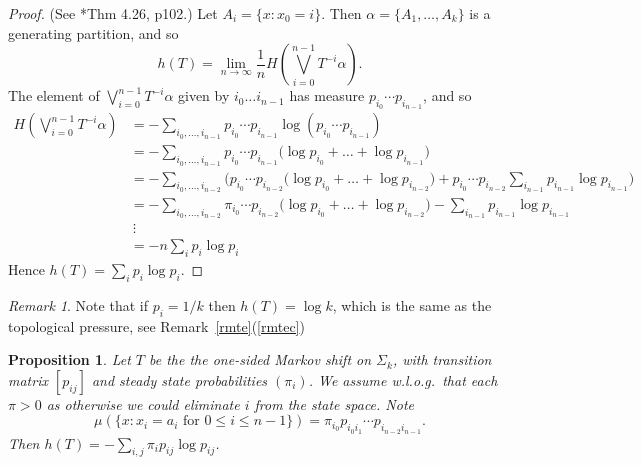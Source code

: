 \documentclass[a4paper]{amsart}
\theoremstyle{plain}
\newtheorem{proposition}[theorem]{Proposition}
\theoremstyle{definition}
\theoremstyle{remark}
\newtheorem{remark}[theorem]{Remark}
\begin{document}
\begin{proof} (See \cite{Wal}*{Thm 4.26, p102}.)
  Let $ A_i = \{ x: x_0 = i \} $.  Then $ \alpha = \{A_1, \dots, A_k\} $ is a generating partition, and so
\[
h(T) = \lim_{n\to \infty} \frac{1}{n} H\left(\bigvee_{i=0}^{n-1} T^{-i} \alpha \right).
\]
The element of $ \bigvee_{i=0}^{n-1} T^{-i} \alpha$ given by $ i_0\dots i_{n-1} $ has measure 
$ p_{i_0}\cdots p_{i_{n-1}} $, and so
\begin{align*}
H\left(\bigvee_{i=0}^{n-1} T^{-i} \alpha \right)
&= -\sum_{i_0,\dots, i_{n-1}} p_{i_0}\cdots p_{i_{n-1}}  \log(p_{i_0}\cdots p_{i_{n-1}} )\\
&= -\sum_{i_0,\dots, i_{n-1} }p_{i_0}\cdots p_{i_{n-1}} \big( \log p_{i_0}+\dots + \log p_{i_{n-1}}  \big)\\
&= -\sum_{i_0,\dots, i_{n-2} } \bigg( p_{i_0}\cdots p_{i_{n-2}} \big( \log p_{i_0}+\dots + \log p_{i_{n-2}}  \big)
                           +   p_{i_0}\cdots p_{i_{n-2}} \sum_{i_{n-1}} p_{i_{n-1}}  \log p_{i_{n-1}} \bigg) \\
&= -\sum_{i_0,\dots, i_{n-2} }  \pi_{i_0}\cdots p_{i_{n-2}} \big( \log p_{i_0}+\dots + \log p_{i_{n-2}} \big) 
                           -     \sum_{i_{n-1}} p_{i_{n-1}}  \log p_{i_{n-1}}  \\
  &\  \vdots \\
  &= -n \sum_i p_i \log p_i                          
\end{align*} 
 Hence $ h(T) =  \sum_i p_i \log p_i   $.
\end{proof} 

\begin{remark}
Note that if $ p_i = 1/k $ then $ h(T) = \log k $, which  is the same as the topological pressure, see Remark~\ref{rmte}(\ref{rmtec})
 \end{remark} 

\begin{proposition} Let $ T $ be the the one-sided  Markov shift  on $ \Sigma_k $, with transition matrix $ [p_{ij}] $ and steady state probabilities $ (\pi_i) $. We assume w.l.o.g.\ that each $ \pi > 0 $ as otherwise we could eliminate $ i $ from the state space. Note 
\[
 \mu(\{x : x_i = a_i \text{ for } 0\leq i \leq n-1 \}) = \pi_{i_0} p_{i_0i_1} \cdots  p_{i_{n-2}i_{n-1}}.
 \]
  Then $ h(T) =-\sum_{i,j} \pi_i p_{ij} \log p_{ij} $.
\end{proposition}
\end{document}
